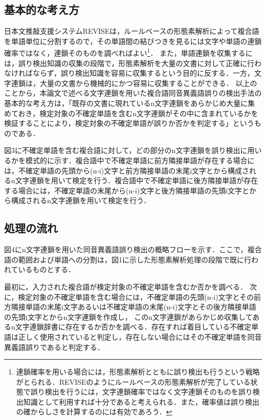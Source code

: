 \subsection{基本的な考え方}
日本文推敲支援システムREVISEは，ルールベースの形態素解析によって複合語を単語単位に分割するので，その単語間の結びつきを見るには文字や単語の連鎖確率ではなく，連鎖そのものを調べればよい\footnote{連鎖確率を用いる場合には，形態素解析とともに誤り検出も行うという戦略がとられる．REVISEのようにルールベースの形態素解析が完了している状態で誤り検出を行うには，文字連鎖確率ではなく文字連鎖そのものを誤り検出知識として利用すれば十分であると考えられる．また，確率値は誤り検出の確からしさを計算するのには有効であろう．}．
また，単語連鎖を収集するには，誤り検出知識の収集の段階で，形態素解析を大量の文書に対して正確に行わなければならず，誤り検出知識を容易に収集するという目的に反する．一方，文字連鎖は，大量の文書から機械的にかつ容易に収集することができる．
以上のことから，本論文で述べる文字連鎖を用いた複合語同音異義語誤りの検出手法の基本的な考え方は，「既存の文書に現れているn文字連鎖をあらかじめ大量に集めておき，検定対象の不確定単語を含むn文字連鎖がその中に含まれているかを検証することにより，検定対象の不確定単語が誤りか否かを判定する」というものである．

図3に不確定単語を含む複合語に対して，どの部分のn文字連鎖を誤り検出に用いるかを模式的に示す．複合語中で不確定単語に前方隣接単語が存在する場合には，不確定単語の先頭から(n-i)文字と前方隣接単語の末尾i文字とから構成されるn文字連鎖を用いて検定を行う．複合語中で不確定単語に後方隣接単語が存在する場合には，不確定単語の末尾から(n-i)文字と後方隣接単語の先頭i文字とから構成されるn文字連鎖を用いて検定を行う．


\begin{figure}[ht]
\begin{center}
\end{center}
\end{figure}


\subsection{処理の流れ}
図4にn文字連鎖を用いた同音異義語誤り検出の概略フローを示す．ここで，複合語の範囲および単語への分割は，図1に示した形態素解析処理の段階で既に行われているものとする．

最初に，入力された複合語が検定対象の不確定単語を含むか否かを調べる．
次に，検定対象の不確定単語を含む場合には，不確定単語の先頭(n-i)文字とその前方隣接単語の末尾i文字あるいは不確定単語の末尾(n-i)文字とその後方隣接単語の先頭i文字とからn文字連鎖を作成し，
このn文字連鎖があらかじめ収集してあるn文字連鎖辞書に存在するか否かを調べる．存在すれば着目している不確定単語は正しく使用されていると判定し，存在しない場合にはその不確定単語を同音異義語誤りであると判定する．


